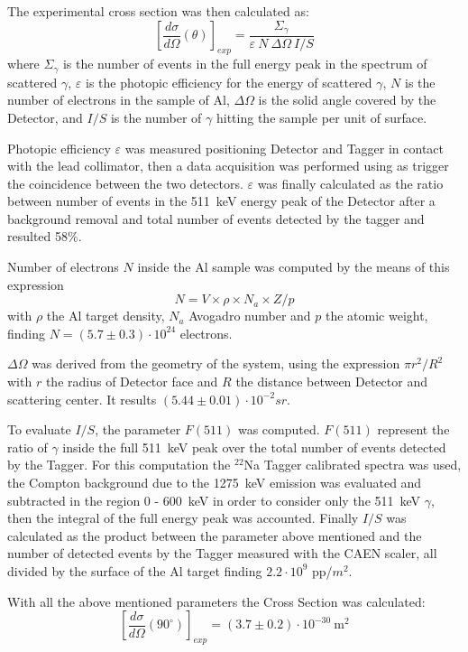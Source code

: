 The experimental cross section was then calculated as:
\begin{equation*}
	\left[\frac{d\sigma}{d\Omega}(\theta)\right]_{exp}=\frac{\Sigma_\gamma}{\varepsilon\ N\ \Delta\Omega\ I/S}
\end{equation*}
 where $\Sigma_\gamma$ is the number of events in the full energy peak in the spectrum of scattered $\gamma$, $\varepsilon$ is the photopic efficiency for the energy of scattered  $\gamma$, $N$ is the number of electrons in the sample of Al, $\Delta\Omega$ is the solid angle covered by the Detector, and $I/S$ is the number of $\gamma$ hitting the sample per unit of surface. 
 
 Photopic efficiency $\varepsilon$ was measured positioning Detector and Tagger in contact with the lead collimator, then a data acquisition was performed using as trigger the coincidence between the two detectors.
 $\varepsilon$ was finally calculated as the ratio between number of events in the 511~keV energy peak of the Detector after a background removal and total number of events detected by the tagger and resulted 58\%.
 
 Number of electrons $N$ inside the Al sample was computed by the means of this expression 
\[
N=V\times \rho\times N_a\times Z/p
\]
with $\rho$ the Al target density, $N_a$ Avogadro number and $p$  the atomic weight, finding $N=(5.7 \pm 0.3)\cdot10^{24}$ electrons.
 
  $\Delta\Omega$ was derived from the geometry of the system, using the expression $\pi r^2/R^2$ with $r$ the radius of Detector face and $R$ the distance between Detector and scattering center. It results $(5.44\pm0.01)\cdot 10^{-2} sr$. 
  
  To evaluate $I/S$, the parameter $F(511)$ was computed. $F(511)$ represent the ratio of $\gamma$ inside the full 511~keV peak over the total number of events detected by the Tagger. For this computation the $^{22}$Na Tagger calibrated spectra was used, the Compton background due to the 1275~keV emission was evaluated and subtracted in the region 0 - 600~keV in order to consider only the 511~keV $\gamma$, then the integral of the full energy peak was accounted. Finally $I/S$ was calculated as the product between the parameter above mentioned and the number of detected events by the Tagger measured with the CAEN scaler, all divided by the surface of the Al target finding $2.2\cdot10^{9}$ pp/$m^2$.
  
  With all the above mentioned parameters the Cross Section was calculated:
  \begin{equation*}
  	\left[\frac{d\sigma}{d\Omega}(90^{\circ})\right]_{exp}=(3.7\pm0.2)\cdot 10^{-30}\ \text{m}^{2}
  \end{equation*}
  
  
 
